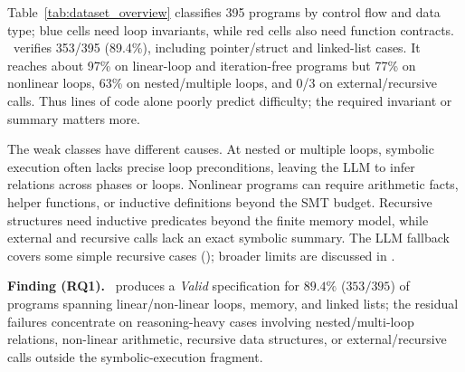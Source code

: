 Table~\ref{tab:dataset_overview} classifies 395 programs by control flow and
data type; blue cells need loop invariants, while red cells also need function
contracts. \toolname\ verifies 353/395 (89.4\%), including pointer/struct and
linked-list cases. It reaches about {97\%} on linear-loop and iteration-free
programs but 77\% on nonlinear loops, 63\% on nested/multiple loops, and
0/3 on external/recursive calls. Thus lines of code alone poorly predict
difficulty; the required invariant or summary matters more.

The weak classes have different causes. At nested or multiple loops,
symbolic execution often lacks precise loop preconditions, leaving the LLM
to infer relations across phases or loops. Nonlinear programs can require
arithmetic facts, helper functions, or inductive definitions beyond the SMT
budget. Recursive structures need inductive predicates beyond the finite
memory model, while external and recursive calls lack an exact symbolic
summary. The LLM fallback covers some simple recursive cases
(); broader limits are discussed in
{}.

\begin{finding}
\textbf{Finding (RQ1).} \toolname\ produces a \emph{Valid} specification for $89.4\%$ ($353/395$) of programs spanning linear/non-linear loops, memory, and linked lists; the residual failures concentrate on reasoning-heavy cases involving nested/multi-loop relations, non-linear arithmetic, recursive data structures, or external/recursive calls outside the symbolic-execution fragment.
\end{finding}
